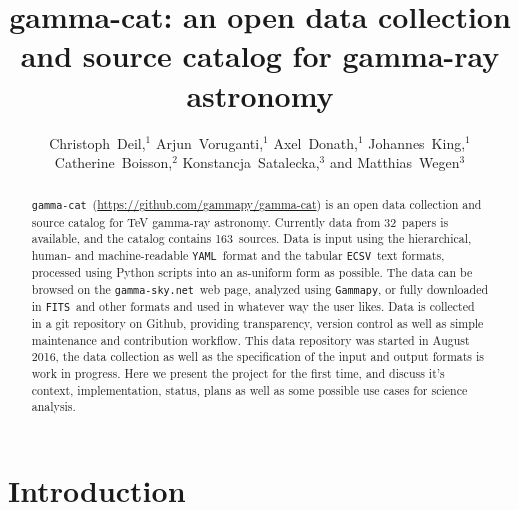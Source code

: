 \documentclass[11pt,twoside]{article}
\newcommand{\gammacat}{\texttt{gamma-cat}}
\newcommand{\gammapy}{\texttt{Gammapy}}
\newcommand{\gammasky}{\texttt{gamma-sky.net}}
\newcommand{\nsources}{163}
\newcommand{\npapers}{32}
\newcommand{\yaml}{\texttt{YAML}}
\newcommand{\ecsv}{\texttt{ECSV}}
\newcommand{\fits}{\texttt{FITS}}
\newcommand{\gammacatgh}{\url{https://github.com/gammapy/gamma-cat}}
\begin{document}
\title{gamma-cat: an open data collection and source catalog for gamma-ray astronomy}

\author{Christoph~Deil,$^1$
Arjun~Voruganti,$^1$
Axel~Donath,$^1$
Johannes~King,$^1$
Catherine~Boisson,$^2$
Konstancja~Satalecka,$^3$
and Matthias~Wegen$^3$
}


\begin{abstract} \gammacat\ (\gammacatgh) is an open data collection and source
catalog for TeV gamma-ray astronomy. Currently data from \npapers~papers is
available, and the catalog contains \nsources~sources. Data is input using the
hierarchical, human- and machine-readable \yaml\ format and the tabular \ecsv\
text formats, processed using Python scripts into an as-uniform form as
possible. The data can be browsed on the \gammasky~web page, analyzed using
\gammapy, or fully downloaded in \fits\ and other formats and used in whatever
way the user likes. Data is collected in a git repository on Github, providing
transparency, version control as well as simple maintenance and contribution
workflow. This data repository was started in August 2016, the data collection
as well as the specification of the input and output formats is work in
progress. Here we present the project for the first time, and discuss it's
context, implementation, status, plans as well as some possible use cases for
science analysis. \end{abstract}

\section{Introduction}
\end{document}
